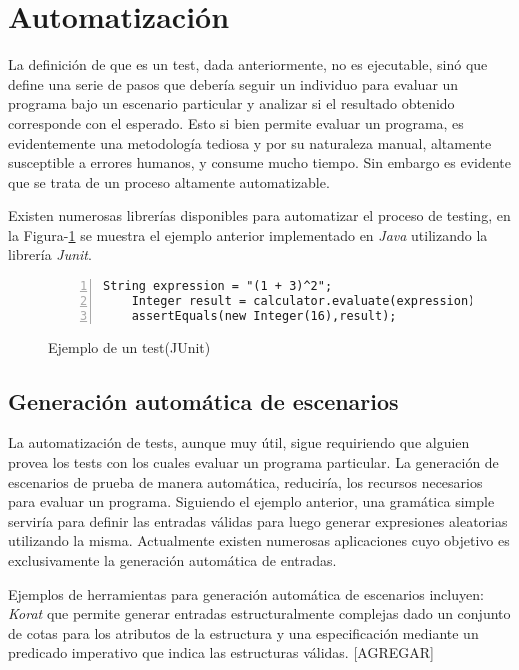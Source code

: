 \section{Automatizaci\'on}
\label{sec:preliminares.testing.automation}

La definici\'on de que es un test, dada anteriormente, no es ejecutable, sin\'o que define una serie de pasos que deber\'ia seguir un individuo para evaluar un programa bajo un escenario particular y analizar si el resultado obtenido corresponde con el esperado. Esto si bien permite evaluar un programa, es evidentemente una metodolog\'ia tediosa y por su naturaleza manual, altamente susceptible a errores humanos, y consume mucho tiempo. Sin embargo es evidente que se trata de un proceso altamente automatizable.

Existen numerosas librer\'ias disponibles para automatizar el proceso de testing, en la Figura-\ref{figures.examples.test.junit} se muestra el ejemplo anterior implementado en \emph{Java} utilizando la librer\'ia \emph{Junit}.

\begin{figure}
	\begin{lstlisting}[frame=single, mathescape=true,numbers=left,framexleftmargin=1.5em]
	String expression = "(1 + 3)^2";
	Integer result = calculator.evaluate(expression);
	assertEquals(new Integer(16),result);
	\end{lstlisting}
	\caption{Ejemplo de un test(JUnit)}
	\label{figures.examples.test.junit}
\end{figure}

\subsection{Generaci\'on autom\'atica de escenarios}

La automatizaci\'on de tests, aunque muy \'util, sigue requiriendo que alguien provea los tests con los cuales evaluar un programa particular. La generaci\'on de escenarios de prueba de manera autom\'atica, reducir\'ia, los recursos necesarios para evaluar un programa. Siguiendo el ejemplo anterior, una gram\'atica simple servir\'ia para definir las entradas v\'alidas para luego generar expresiones aleatorias utilizando la misma. Actualmente existen numerosas aplicaciones cuyo objetivo es exclusivamente la generaci\'on autom\'atica de entradas.

Ejemplos de herramientas para generaci\'on autom\'atica de escenarios incluyen: \emph{Korat} \cite{bibliography.inputGeneration.korat.BoyapatiKM02} que permite generar entradas estructuralmente complejas dado un conjunto de cotas para los atributos de la estructura y una especificaci\'on mediante un predicado imperativo que indica las estructuras v\'alidas. [AGREGAR]

